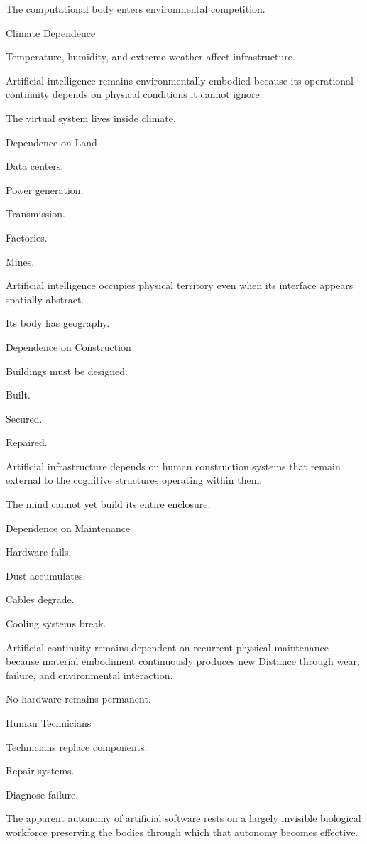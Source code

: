 The computational body enters environmental competition.

Climate Dependence

Temperature, humidity, and extreme weather affect infrastructure.

Artificial intelligence remains environmentally embodied because its operational continuity depends on physical conditions it cannot ignore.

The virtual system lives inside climate.

Dependence on Land

Data centers.

Power generation.

Transmission.

Factories.

Mines.

Artificial intelligence occupies physical territory even when its interface appears spatially abstract.

Its body has geography.

Dependence on Construction

Buildings must be designed.

Built.

Secured.

Repaired.

Artificial infrastructure depends on human construction systems that remain external to the cognitive structures operating within them.

The mind cannot yet build its entire enclosure.

Dependence on Maintenance

Hardware fails.

Dust accumulates.

Cables degrade.

Cooling systems break.

Artificial continuity remains dependent on recurrent physical maintenance because material embodiment continuously produces new Distance through wear, failure, and environmental interaction.

No hardware remains permanent.

Human Technicians

Technicians replace components.

Repair systems.

Diagnose failure.

The apparent autonomy of artificial software rests on a largely invisible biological workforce preserving the bodies through which that autonomy becomes effective.

